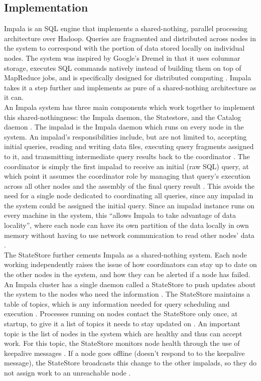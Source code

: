 \documentclass[onecolumn, draftclsnofoot,10pt, compsoc]{IEEEtran}
\begin{document}
    \subsection{Implementation}
    \indent Impala is an SQL engine that implements a shared-nothing, parallel processing architecture over Hadoop. Queries are fragmented and distributed across nodes in the system to correspond with the portion of data stored locally on individual nodes. The system was inspired by Google’s Dremel in that it uses columnar storage, executes SQL commands natively instead of building them on top of MapReduce jobs, and is specifically designed for distributed computing \cite{SQLonHadoop} \cite{Dremel}. Impala takes it a step further and implements as pure of a shared-nothing architecture as it can. \\

\indent An Impala system has three main components which work together to implement this shared-nothingness: the Impala daemon, the Statestore, and the Catalog daemon \cite{ImpalaGuide}. The impalad is the Impala daemon which runs on every node in the system. An impalad’s responsibilities include, but are not limited to, accepting initial queries, reading and writing data files, executing query fragments assigned to it, and transmitting intermediate query results back to the coordinator \cite{Impala} \cite{ImpalaGuide}. The coordinator is simply the first impalad to receive an initial (raw SQL) query, at which point it assumes the coordinator role by managing that query’s execution across all other nodes and the assembly of the final query result \cite{Impala}. This avoids the need for a single node dedicated to coordinating all queries, since any impalad in the system could be assigned the initial query. Since an impalad instance runs on every machine in the system, this “allows Impala to take advantage of data locality”, where each node can have its own partition of the data locally in own memory without having to use network communication to read other nodes’ data \cite{Impala}. \\

\indent The StateStore further cements Impala as a shared-nothing system. Each node working independently raises the issue of how coordinators can stay up to date on the other nodes in the system, and how they can be alerted if a node has failed. An Impala cluster has a single daemon called a StateStore to push updates about the system to the nodes who need the information \cite{Impala}. The StateStore maintains a table of topics, which is any information needed for query scheduling and execution \cite{ImpalaGuide}. Processes running on nodes contact the StateStore only once, at startup, to give it a list of topics it needs to stay updated on \cite{Impala}. An important topic is the list of nodes in the system which are healthy and thus can accept work. For this topic, the StateStore monitors node health through the use of keepalive messages \cite{Impala}. If a node goes offline (doesn’t respond to to the keepalive message), the StateStore broadcasts this change to the other impalads, so they do not assign work to an unreachable node \cite{ImpalaGuide}. \\
\end{document}
